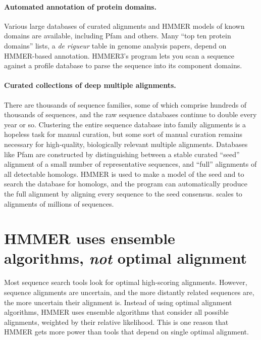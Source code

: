 \paragraph{Automated annotation of protein domains.}
Various large databases of curated alignments and HMMER models of
known domains are available, including Pfam and others.  Many ``top
ten protein domains'' lists, a \emph{de rigueur} table in genome
analysis papers, depend on HMMER-based annotation. HMMER3's
 program lets you scan a sequence against a profile
database to parse the sequence into its component domains.

\paragraph{Curated collections of deep multiple alignments.}  There are thousands of
sequence families, some of which comprise hundreds of thousands of
sequences, and the raw sequence databases continue to double every
year or so. Clustering the entire sequence database into family
alignments is a hopeless task for manual curation, but some sort of
manual curation remains necessary for high-quality, biologically
relevant multiple alignments. Databases like Pfam are constructed by
distinguishing between a stable curated ``seed'' alignment of a small
number of representative sequences, and ``full'' alignments of all
detectable homologs. HMMER is used to make a model of the seed and to
search the database for homologs, and the  program can
automatically produce the full alignment by aligning every sequence to
the seed consensus.  scales to alignments of 
millions of sequences.



\section{HMMER uses ensemble algorithms, \emph{not} optimal alignment}

Most sequence search tools look for optimal high-scoring
alignments. However, sequence alignments are uncertain, and the more
distantly related sequences are, the more uncertain their alignment
is. Instead of using optimal alignment algorithms, HMMER uses ensemble
algorithms that consider all possible alignments, weighted by their
relative likelihood. This is
one reason that HMMER gets more power than tools that depend on single
optimal alignment.

